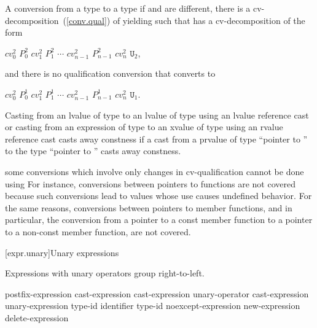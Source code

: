 \pnum
{}%
A conversion from a type  to a type 
if  and  are different,
there is a cv-decomposition~(\ref{conv.qual}) of 
yielding  such that
 has a cv-decomposition of the form

\begin{indented}
$cv_0^2$ $P_0^2$ $cv_1^2$ $P_1^2$ $\cdots$ $cv_{n-1}^2$ $P_{n-1}^2$ $cv_n^2$ $\mathtt{U}_2$,
\end{indented}

and there is no qualification conversion that converts  to

\begin{indented}
$cv_0^2$ $P_0^1$ $cv_1^2$ $P_1^1$ $\cdots$ $cv_{n-1}^2$ $P_{n-1}^1$ $cv_n^2$ $\mathtt{U}_1$.
\end{indented}

\pnum
Casting from an lvalue of type  to an lvalue of type
 using an lvalue reference cast
or casting from an expression of type  to an xvalue of type  using
an rvalue reference cast
casts away constness if a cast from a prvalue of type ``pointer to '' to the type ``pointer to
'' casts away constness.

\pnum
\enternote 
some conversions which involve only changes in cv-qualification cannot
be done using  For instance, conversions between
pointers to functions are not covered because such conversions lead to
values whose use causes undefined behavior. For the same reasons,
conversions between pointers to member functions, and in particular, the
conversion from a pointer to a const member function to a pointer to a
non-const member function, are not covered.
\exitnote%

[expr.unary]{Unary expressions}

\pnum
{}%
Expressions with unary operators group right-to-left.

%
%
%
%
%
\begin{bnf}
\br
    postfix-expression\br
    \terminal{++} cast-expression\br
    \terminal{-{-}} cast-expression\br
    unary-operator cast-expression\br
     unary-expression\br
     type-id \terminal{)}\br
     \terminal{(} identifier \terminal{)}\br
     type-id \terminal{)}\br
    noexcept-expression\br
    new-expression\br
    delete-expression
\end{bnf}

